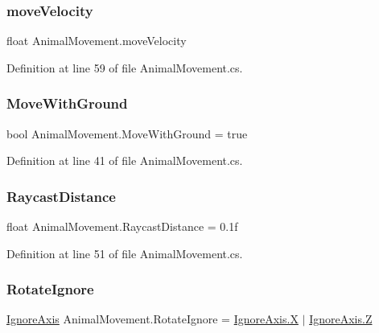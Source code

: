 \subsubsection{\texorpdfstring{move\+Velocity}{moveVelocity}}
{\footnotesize\ttfamily float Animal\+Movement.\+move\+Velocity}



Definition at line 59 of file Animal\+Movement.\+cs.

\mbox{\label{class_animal_movement_a60fedb1b7c82f4d2322253dbdc3d82f9}} 
\subsubsection{\texorpdfstring{Move\+With\+Ground}{MoveWithGround}}
{\footnotesize\ttfamily bool Animal\+Movement.\+Move\+With\+Ground = true}



Definition at line 41 of file Animal\+Movement.\+cs.

\mbox{\label{class_animal_movement_a77461117bfd11a143fc92795d517aa89}} 
\subsubsection{\texorpdfstring{Raycast\+Distance}{RaycastDistance}}
{\footnotesize\ttfamily float Animal\+Movement.\+Raycast\+Distance = 0.\+1f}



Definition at line 51 of file Animal\+Movement.\+cs.

\mbox{\label{class_animal_movement_abe1357180ff4eb0ad9a0f7cc886a252b}} 
\subsubsection{\texorpdfstring{Rotate\+Ignore}{RotateIgnore}}
{\footnotesize\ttfamily \mbox{\hyperlink{_ignore_axis_8cs_aa61b0141055d583a4f5b013297a1d48f}{Ignore\+Axis}} Animal\+Movement.\+Rotate\+Ignore = \mbox{\hyperlink{_ignore_axis_8cs_aa61b0141055d583a4f5b013297a1d48fa02129bb861061d1a052c592e2dc6b383}{Ignore\+Axis.\+X}} $\vert$ \mbox{\hyperlink{_ignore_axis_8cs_aa61b0141055d583a4f5b013297a1d48fa21c2e59531c8710156d34a3c30ac81d5}{Ignore\+Axis.\+Z}}}



